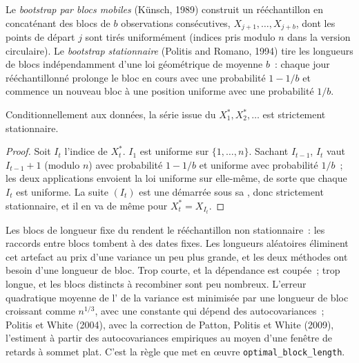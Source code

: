 \begin{definition}\label{def:qm:resampling:blocks}
Le \emph{bootstrap par blocs mobiles} (Künsch, 1989) construit un rééchantillon en concaténant des blocs de $b$
observations consécutives, $X_{j+1}, \dots, X_{j+b}$, dont les points de départ $j$ sont tirés uniformément (indices pris modulo $n$ dans la
version circulaire). Le \emph{bootstrap stationnaire} (Politis and Romano, 1994) tire les longueurs de blocs
indépendamment d'une loi géométrique de moyenne $b$~: chaque jour rééchantillonné prolonge le bloc en cours avec une probabilité $1 - 1/b$ et
commence un nouveau bloc à une position uniforme avec une probabilité $1/b$.
\end{definition}

\begin{proposition}\label{prop:qm:resampling:stationary}
Conditionnellement aux données, la série issue du  $X_1^*, X_2^*, \dots$ est strictement stationnaire.
\end{proposition}

\begin{proof}
Soit $I_t$ l'indice de $X_t^*$. $I_1$ est uniforme sur $\{1, \dots, n\}$. Sachant $I_{t-1}$, $I_t$ vaut $I_{t-1} + 1$ (modulo $n$) avec
probabilité $1 - 1/b$ et uniforme avec probabilité $1/b$~; les deux applications envoient la loi uniforme sur elle-même, de sorte que chaque $I_t$ est uniforme. La
suite $(I_t)$ est une  démarrée sous sa , donc strictement stationnaire, et il en va de même pour $X_t^* = X_{I_t}$.
\end{proof}

Les blocs de longueur fixe du  rendent le rééchantillon non stationnaire~: les raccords entre blocs tombent à des
dates fixes. Les longueurs aléatoires éliminent cet artefact au prix d'une variance un peu plus grande, et les deux méthodes ont besoin d'une longueur de bloc. Trop courte, et
la dépendance est coupée~; trop longue, et les blocs distincts à recombiner sont peu nombreux. L'erreur quadratique moyenne de l' de la variance est
minimisée par une longueur de bloc croissant comme $n^{1/3}$, avec une constante qui dépend des autocovariances~; Politis et White (2004),
avec la correction de Patton, Politis et White (2009), l'estiment à partir des autocovariances empiriques au moyen d'une fenêtre de retards à sommet plat.
C'est la règle que met en œuvre \texttt{optimal\_block\_length}.

